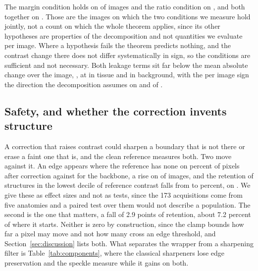 The margin condition holds on \CondMargin{} of \NImages{} images and the ratio condition on
\CondSigma{}, and both together on \CondBoth{}. Those \CondBoth{} are the images on which the two
conditions we measure hold jointly, not a count on which the whole theorem applies, since its other
hypotheses are properties of the decomposition and not quantities we evaluate per image. Where a
hypothesis fails the theorem predicts nothing, and the contrast change there does not differ
systematically in sign, so the conditions are sufficient and not necessary. Both leakage terms sit
far below the mean absolute change over the image, \GlobalChange{}, at \EtaT{} in tissue and \EtaB{}
in background, with the per image sign the direction the decomposition assumes on \EtaTPos{} and
\EtaBNeg{} of \NImages{}.

\subsection{Safety, and whether the correction invents structure}
\label{sec:safety_check}
A correction that raises contrast could sharpen a boundary that is not there or erase a faint one
that is, and the clean reference measures both. Two move against it. An edge appears where the
reference has none on \EdgeInvCorr{} percent of pixels after correction against \EdgeInvBack{} for
the backbone, a rise on \EdgeInvUp{} of \NImages{} images, and the retention of structures in the
lowest decile of reference contrast falls from \WeakRetBack{} to \WeakRetCorr{} percent, on
\WeakRetDown{}. We give these as effect sizes and not as tests, since the 173
acquisitions come from five anatomies and a paired test over them would not describe a population.
The second is the one that matters, a fall of 2.9 points of retention, about 7.2 percent of where it
starts. Neither is zero by construction, since the clamp bounds how far a pixel
may move and not how many cross an edge threshold, and Section~\ref{sec:discussion} lists both. What
separates the wrapper from a sharpening filter is Table~\ref{tab:components}, where the classical
sharpeners lose edge preservation and the speckle measure while it gains on both.

